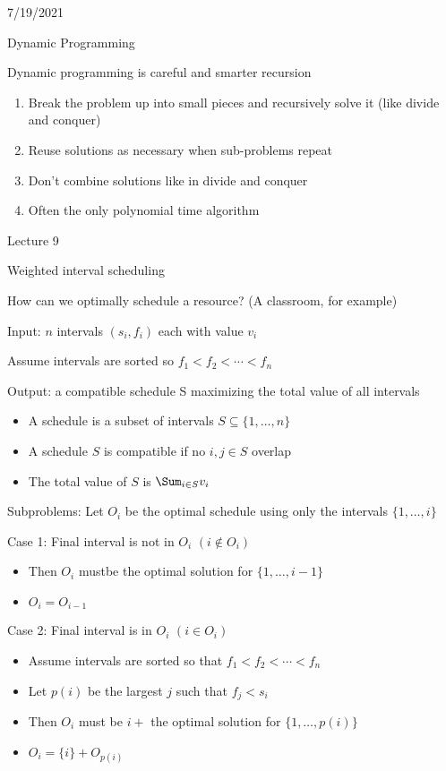 \documentclass[12pt]{article}
\begin{document}
7/19/2021

Dynamic Programming

Dynamic programming is careful and smarter recursion \begin{enumerate}
    \item Break the problem up into small pieces and recursively solve it (like divide and conquer)
    \item Reuse solutions as necessary when sub-problems repeat
    \item Don't combine solutions like in divide and conquer
    \item Often the only polynomial time algorithm
\end{enumerate}


Lecture 9

Weighted interval scheduling

How can we optimally schedule a resource? (A classroom, for example)

Input: $n$ intervals $(s_i, f_i)$ each with value $v_i$

Assume intervals are sorted so $f_1 < f_2 < \cdots < f_n$

Output: a compatible schedule S maximizing the total value of all intervals \begin{itemize}
    \item A schedule is a subset of intervals $S \subseteq \{ 1, \ldots, n \}$
    \item A schedule $S$ is compatible if no $i, j \in S$ overlap
    \item The total value of $S$ is $\Sum_{i \in S} v_i$
\end{itemize}

Subproblems: Let $O_i$ be the optimal schedule using only the intervals $\{ 1, \ldots, i \}$

Case 1: Final interval is not in $O_i$ $(i \notin O_i)$ \begin{itemize}
    \item Then $O_i$ mustbe the optimal solution for $\{ 1, \ldots, i - 1 \}$
    \item $O_i = O_{i - 1}$
\end{itemize}

Case 2: Final interval is in $O_i$ $(i \in O_i)$ \begin{itemize}
    \item Assume intervals are sorted so that $f_1 < f_2 < \cdots < f_n $
    \item Let $p(i)$ be the largest $j$ such that $f_j < s_i$
    \item Then $O_i$ must be $i +$ the optimal solution for $\{ 1, \ldots, p(i) \}$
    \item $O_i = \{ i \} + O_{p(i)}$
\end{itemize}
\end{document}
